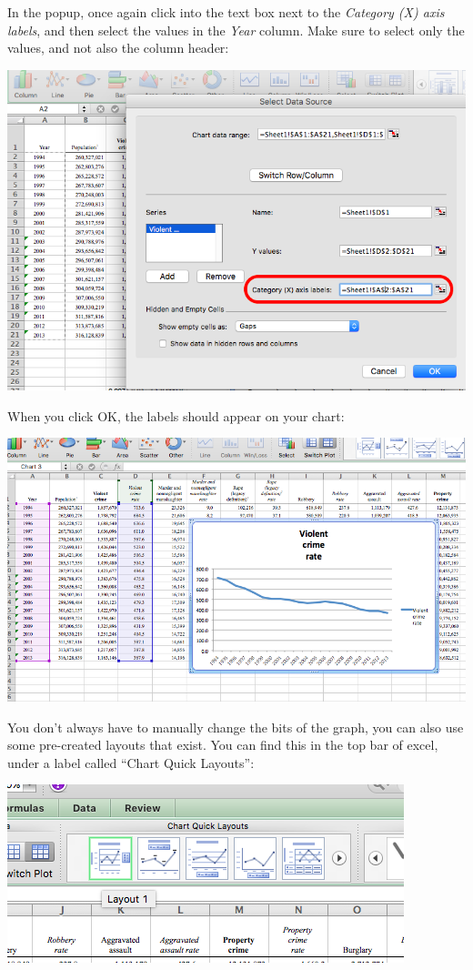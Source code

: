 \documentclass[
]{book}
\begin{document}
In the popup, once again click into the text box next to the \emph{Category (X) axis labels}, and then select the values in the \emph{Year} column. Make sure to select only the values, and not also the column header:

\includegraphics{imgs/desc_viz_4.png}

When you click OK, the labels should appear on your chart:

\includegraphics{imgs/desc_line_3.png}

You don't always have to manually change the bits of the graph, you can also use some pre-created layouts that exist. You can find this in the top bar of excel, under a label called ``Chart Quick Layouts'':

\includegraphics{imgs/desc_line_layout.png}
\end{document}
